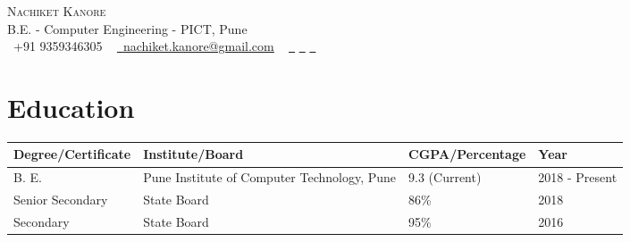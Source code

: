 \documentclass[letterpaper,11pt]{article}
\begin{document}

\begin{center}
    {\Huge \scshape Nachiket Kanore} \\ \vspace{1pt}
    B.E. - Computer Engineering - PICT, Pune \\ \vspace{1pt}
    \small \raisebox{-0.1\height}\faPhone\ +91 9359346305 ~ \href{mailto:nachiket.kanore@gmail.com}{\raisebox{-0.2\height}\faEnvelope\  \underline{nachiket.kanore@gmail.com}} ~ 
    \href{https://linkedin.com/in/nachiketkanore}{\raisebox{-0.2\height}\faLinkedin\ \underline{}}
    \href{https://github.com/nachiketkanore}{\raisebox{-0.2\height}\faGithub\ \underline{}}
    \href{https://twitter.com/nachiket_kanore}{\raisebox{-0.2\height}\faTwitter\ \underline{}}
    \vspace{-8pt}
\end{center}


\section{Education}

\begin{tabular}{ |p{4cm}|p{8.2cm}|p{4cm}|p{3.1cm}|  }

 \hline
 \hfil \textbf{Degree/Certificate} & \hfil \textbf{Institute/Board} & \hfil \textbf{CGPA/Percentage} & \hfil \textbf{Year}\\
 \hline
 \hfil {\footnotesize B. E.} & \hfil {\footnotesize Pune Institute of Computer Technology, Pune} & \hfil {\footnotesize 9.3 (Current)}& \hfil {\footnotesize 2018 - Present}\\
 \hfil {\footnotesize Senior Secondary} & \hfil {\footnotesize State Board}  & \hfil {\footnotesize 86\%} & \hfil {\footnotesize 2018}\\
 \hfil {\footnotesize Secondary} & \hfil {\footnotesize State Board}  & \hfil {\footnotesize 95\%} & \hfil {\footnotesize 2016}\\
 \hline
\end{tabular}
\end{document}
